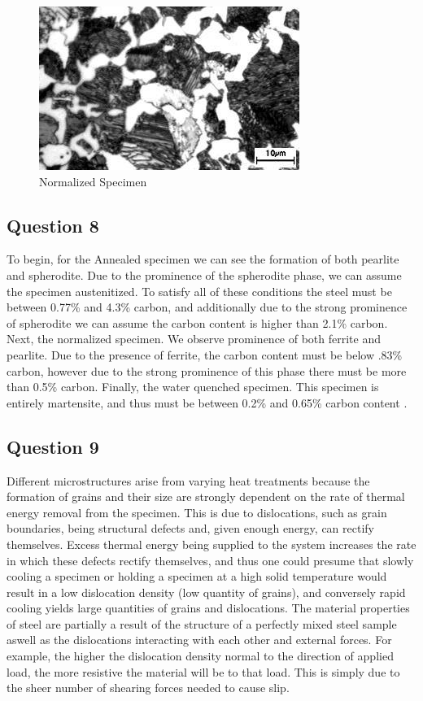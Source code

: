\documentclass{article}
\begin{document}
\begin{figure}[!h!]
    \centering
    \includegraphics[width=0.5\linewidth]{plots/microC.jpg}
    \caption{Normalized Specimen}
    \label{fig:nm}
\end{figure}

\newpage
\subsection*{Question 8}
To begin, for the Annealed specimen we can see the formation of both pearlite and spherodite. Due to the prominence of the spherodite phase, we can assume the specimen austenitized. To satisfy all of these conditions the steel must be between 0.77\% and 4.3\% carbon, and additionally due to the strong prominence of spherodite we can assume the carbon content is higher than 2.1\% carbon. Next, the normalized specimen. We observe prominence of both ferrite and pearlite. Due to the presence of ferrite, the carbon content must be below .83\% carbon, however due to the strong prominence of this phase there must be more than 0.5\% carbon. Finally, the water quenched specimen. This specimen is entirely martensite, and thus must be between 0.2\% and 0.65\% carbon content \cite{lab5paper}. 



\subsection*{Question 9}
Different microstructures arise from varying heat treatments because the formation of grains and their size are strongly dependent on the rate of thermal energy removal from the specimen. This is due to dislocations, such as grain boundaries, being structural defects and, given enough energy, can rectify themselves. Excess thermal energy being supplied to the system increases the rate in which these defects rectify themselves, and thus one could presume that slowly cooling a specimen or holding a specimen at a high solid temperature would result in a low dislocation density (low quantity of grains), and conversely rapid cooling yields large quantities of grains and dislocations. The material properties of steel are partially a result of the structure of a perfectly mixed steel sample aswell as the dislocations interacting with each other and external forces. For example, the higher the dislocation density normal to the direction of applied load, the more resistive the material will be to that load. This is simply due to the sheer number of shearing forces needed to cause slip. 
\newpage
\end{document}

